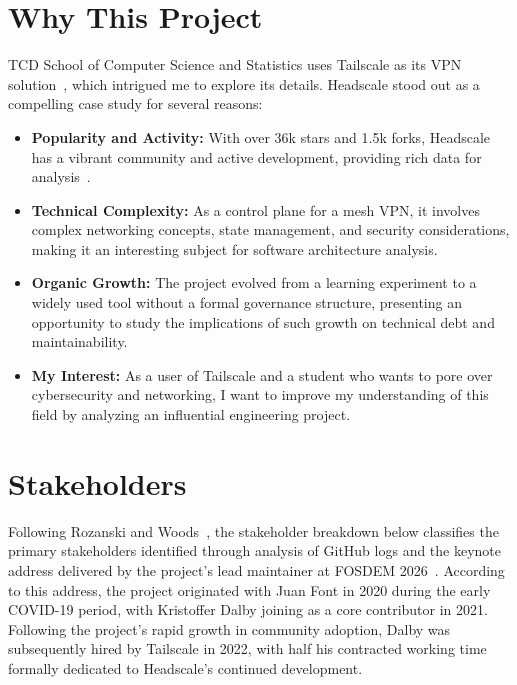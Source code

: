\documentclass[11pt, a4paper]{article}
\begin{document}
\section{Why This Project}


TCD School of Computer Science and Statistics uses Tailscale as its VPN solution~\cite{TCD_SCSS_support_wiki}, which intrigued me to explore its details. Headscale stood out as a compelling case study for several reasons:
\begin{itemize}
    \item \textbf{Popularity and Activity:} With over 36k stars and 1.5k forks, Headscale has a vibrant community and active development, providing rich data for analysis~\cite{headscale_github}.
    \item \textbf{Technical Complexity:} As a control plane for a mesh VPN, it involves complex networking concepts, state management, and security considerations, making it an interesting subject for software architecture analysis.
    \item \textbf{Organic Growth:} The project evolved from a learning experiment to a widely used tool without a formal governance structure, presenting an opportunity to study the implications of such growth on technical debt and maintainability.
    \item \textbf{My Interest:} As a user of Tailscale and a student who wants to pore over cybersecurity and networking, I want to improve my understanding of this field by analyzing an influential engineering project.
\end{itemize}


\section{Stakeholders}
\label{sec:stakeholders}

Following Rozanski and Woods~\cite{R&W_2011}, the stakeholder breakdown below classifies the primary stakeholders identified through analysis of GitHub logs and the keynote address delivered by the project's lead maintainer at FOSDEM 2026~\cite{headscale_FOSDEM2026_speech}. According to this address, the project originated with Juan Font in 2020 during the early COVID-19 period, with Kristoffer Dalby joining as a core contributor in 2021. Following the project's rapid growth in community adoption, Dalby was subsequently hired by Tailscale in 2022, with half his contracted working time formally dedicated to Headscale's continued development.
\end{document}
